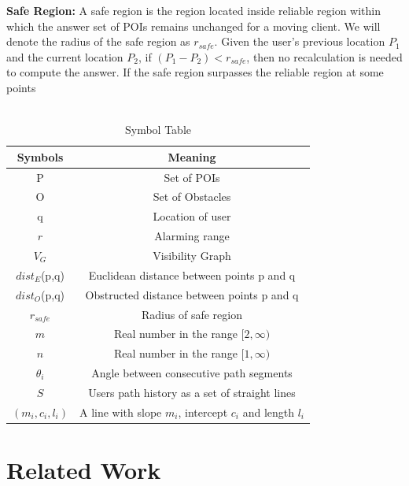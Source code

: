 \documentclass{sig-alternate}
\begin{document}
\textbf{Safe Region:} A safe region is the region located inside reliable region within which the answer set of POIs remains unchanged for a moving client. We will denote the radius of the safe region as $r_{safe}$. Given the user's previous location $P_1$ and the current location $P_2$, if $(P_1 - P_2) < r_{safe}$, then no recalculation is needed to compute the answer. If the safe region surpasses the reliable region at some points 
\\ \\

\begin{table}[h]
\centering 

\caption{Symbol Table}
\begin{tabular}{|c|c|} \hline
Symbols&Meaning \\ \hline
P & Set of POIs\\ \hline
O & Set of Obstacles\\ \hline
q & Location of user\\ \hline
$r$ & Alarming range\\ \hline
$V_{G}$       & Visibility Graph\\ \hline
$dist_E$(p,q) & Euclidean distance between points p and q\\ \hline
$dist_O$(p,q) & Obstructed distance between points p and q\\ \hline
$r_{safe}$    & Radius of safe region\\ \hline
$m$           & Real number in the range $[2,\infty)$ \\ \hline
$n$           & Real number in the range $[1,\infty) $  \\ \hline
$\theta_i $   & Angle between consecutive path segments \\ \hline 
$ S $         & Users path history as a set of straight lines \\ \hline
$(m_i,c_i,l_i)$ & A line with slope $m_i$, intercept $c_i$ and length $l_i$ \\ \hline

\end{tabular}
\end{table}

 
\section{Related Work}
\end{document}
